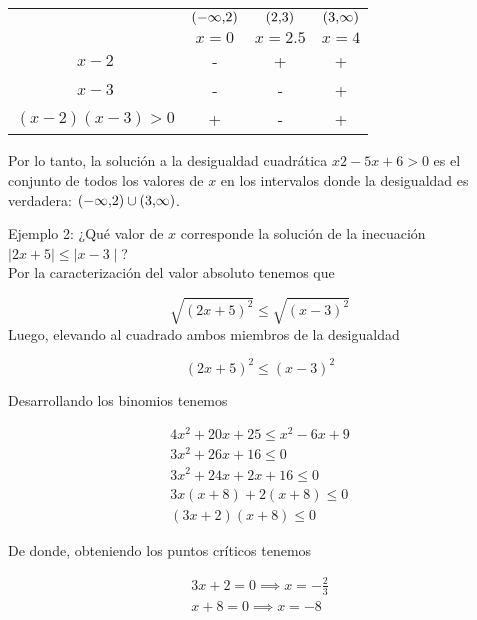 \documentclass[a4paper,12pt]{article}
\begin{document}
\bgroup
\def\arraystretch{1.5}%
\begin{table}[ht!]
\begin{center}
\begin{tabular}{ c | c  c  c }
		& $\interval({-\infty,2})$ & $\interval({2,3})$ & $\interval({3,\infty})$ \\ [0.5ex]
	& $x=0$ & $x=2.5$ 	& $x=4$ \\ 	\hline
	$x-2$ & - & + & + \\
	$x-3$ & - & - & + \\
	$(x-2)(x-3) > 0$ & + & - & + \\ 
\end{tabular}
\end{center}
\end{table}

Por lo tanto, la solución a la desigualdad cuadrática $x2-5x+6>0$ es el conjunto de todos los valores de $x$ en los intervalos donde la desigualdad es verdadera: $\interval({-\infty,2}) \cup \interval({3,\infty})$. \par

\newpage

Ejemplo 2: ¿Qué valor de $x$ corresponde la solución de la inecuación $\mid 2x + 5 \mid \leq \mid x-3 \mid$? \\

Por la caracterización del valor absoluto tenemos que

\[
	\sqrt{(2x+5)^2} \leq \sqrt{(x-3)^2}
\]
Luego, elevando al cuadrado ambos miembros de la desigualdad

\[
	(2x+5)^2 \leq (x-3)^2
\]

Desarrollando los binomios tenemos

\vspace{-0.5cm}

\begin{align*}
	4x^2 +20x +25 \leq x^2 -6x +9 \\
	3x^2 +26x +16 \leq 0 \\
	3x^2 +24x +2x +16 \leq 0 \\
	3x(x + 8) + 2(x + 8) \leq 0 \\
	(3x + 2)(x + 8) \leq 0
\end{align*}

De donde, obteniendo los puntos críticos tenemos

\begin{align*}
	3x+2 = 0 \implies x = -\frac{2}{3} \\
	x+8 = 0 \implies x = -8
\end{align*}
\end{document}
